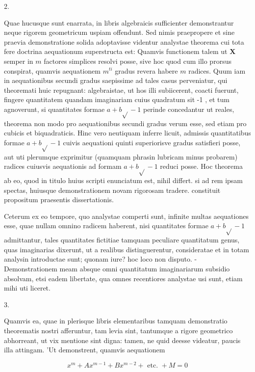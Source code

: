 \documentclass[twoside,12pt, showframe]{memoir}
\begin{document}
2.

Quae hucusque sunt enarrata, in libris algebraicis sufficienter demonstrantur neque rigorem geometricum uspiam offendunt. Sed nimis praepropere et sine praevia demonstratione solida adoptavisse videntur analystae theorema cui tota fere doctrina aequationum superstructa est: Quamvis functionem talem ut \(\boldsymbol{X}\) semper in \(m\) factores simplices resolvi posse, sive hoc quod cum illo prorsus conspirat, quamvis aequationem \(m^{t i}\) gradus revera habere \(m\) radices. Quum iam in aequationibus secundi gradus saepissime ad tales casus perveniatur, qui theoremati huic repugnant: algebraistae, ut hos illi subiicerent, coacti fuerunt, fingere quantitatem quandam imaginariam cuius quadratum sit -1 , et tum agnoverunt, si quantitates formae \(a+b \sqrt{ }-1\) perinde concedantur ut reales, theorema non modo pro aequationibus secundi gradus verum esse, sed etiam pro cubicis et biquadraticis. Hinc vero neutiquam inferre licuit, admissis quantitatibus formae \(a+b \sqrt{ }-1\) cuivis aequationi quinti superiorisve gradus satisfieri posse, aut uti plerumque exprimitur (quamquam phrasin lubricam minus probarem) radices cuiusvis aequationis ad formam \(a+b \sqrt{ }-1\) reduci posse. Hoc theorema ab eo, quod in titulo huius scripti enunciatum est, nihil differt. si ad rem ipsam spectas, huiusque demonstrationem novam rigorosam tradere. constituit propositum praesentis dissertationis.

Ceterum ex eo tempore, quo analystae comperti sunt, infinite multas aequationes esse, quae nullam omnino radicem haberent, nisi quantitates formae \(a+b \sqrt{ }-1\) admittantur, tales quantitates fictitiae tamquam peculiare quantitatum genus, quas imaginarias dixerunt, ut a realibus distinguerentur, consideratae et in totam analysin introductae sunt; quonam iure? hoc loco non disputo. - Demonstrationem meam absque omni quantitatum imaginariarum subsidio absolvam, etsi eadem libertate, qua omnes recentiores analystae usi sunt, etiam mihi uti liceret.

3.

Quamvis ea, quae in plerisque libris elementaribus tamquam demonstratio theorematis nostri afferuntur, tam levia sint, tantumque a rigore geometrico abhorreant, ut vix mentione sint digna: tamen, ne quid deesse videatur, paucis illa attingam. 'Ut demonstrent, quamvis aequationem

\[
x^{m}+A x^{m-1}+B x^{m-2}+\text { etc. }+M=0
\]
\end{document}

